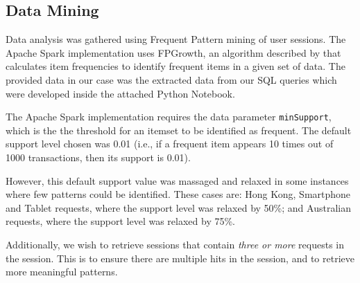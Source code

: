 \subsection{Data Mining}

Data analysis was gathered using Frequent Pattern mining of user sessions. The Apache Spark implementation \citep{spark} uses FPGrowth, an algorithm described by \citet{Han:2000:MFP:335191.335372} that calculates item frequencies to identify frequent items in a given set of data. The provided data in our case was the extracted data from our SQL queries which were developed inside the attached Python Notebook.

The Apache Spark implementation requires the data parameter \texttt{minSupport}, which is the the threshold for an itemset to be identified as frequent. The default support level chosen was 0.01 (i.e., if a frequent item appears 10 times out of 1000 transactions, then its support is 0.01).

However, this default support value was massaged and relaxed in some instances where few patterns could be identified. These cases are: Hong Kong, Smartphone and Tablet requests, where the support level was relaxed by 50\%; and Australian requests, where the support level was relaxed by 75\%.

Additionally, we wish to retrieve sessions that contain \textit{three or more} requests in the session. This is to ensure there are multiple hits in the session, and to retrieve more meaningful patterns.